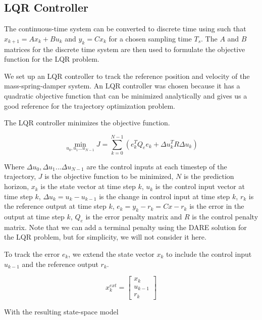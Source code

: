 \documentclass{article}
\begin{document}
\subsection{LQR Controller} \label{lqr_ctrl}
The continuous-time system can be converted to discrete time using such that $x_{k+1} = A x_k + B u_k$ and $y_k = C x_k$ for a chosen sampling time $T_s$.
The $A$ and $B$ matrices for the discrete time system are then used to formulate the objective function for the LQR problem.

We set up an LQR controller to track the reference position and velocity of the mass-spring-damper system.
An LQR controller was chosen because it has a quadratic objective function that can be minimized analytically and gives us a
good reference for the trajectory optimization problem.

The LQR controller minimizes the objective function.

$$
\min_{u_0, u_1 ... u_{N-1}}J = \sum_{k=0}^{N-1} (e_k^T Q_e e_k + \Delta u_k^T R \Delta u_k)
$$

Where $\Delta u_0, \Delta u_1 ... \Delta u_{N-1}$ are the control inputs at each timestep of the trajectory,
$J$ is the objective function to be minimized, $N$ is the prediction horizon, $x_k$ is the state vector at time step $k$,
$u_k$ is the control input vector at time step $k$, $\Delta u_k = u_k - u_{k-1}$ is the change in control input at time step $k$,
$r_k$ is the reference output at time step $k$, $e_k = y_k - r_k = Cx - r_k$ is the error in the output at time step $k$,
$Q_e$ is the error penalty matrix and $R$ is the control penalty matrix.
Note that we can add a terminal penalty using the DARE solution for the LQR problem, but for simplicity, we will not consider it here.

To track the error $e_k$, we extend the state vector $x_k$ to include the control input $u_{k-1}$ and the reference output $r_k$.

$$
x_k^{ext} =
\begin{bmatrix}
  x_k \\
  u_{k-1} \\
  r_k
\end{bmatrix}
$$

With the resulting state-space model
\end{document}
